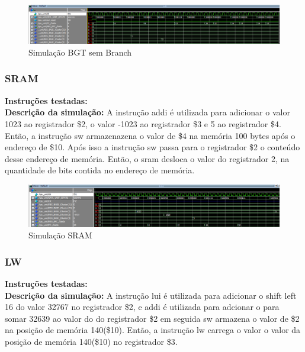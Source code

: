 \begin{figure}[htbp!]
\centering
\includegraphics[width=1\textwidth]{figure/simulacao_bgt_sem_branch.png}
\caption{Simulação BGT sem Branch} 
\label{fig:imagem_massa}
\end{figure}

\newpage

\subsubsection{SRAM}
\textbf{Instruções testadas:}
 \\

\textbf{Descrição da simulação:} A instrução addi é utilizada para adicionar o valor 1023 ao registrador \$2, o valor -1023 ao registrador \$3 e 5 ao registrador \$4. Então, a instrução sw armazenazena o valor de \$4 na memória 100 bytes após o endereço de \$10. Após isso a instrução sw passa para o registrador \$2 o conteúdo desse endereço de memória. Então, o sram desloca o valor do registrador 2, na quantidade de bits contida no endereço de memória.  \\

\begin{figure}[htbp!]
\centering
\includegraphics[width=1\textwidth]{figure/simulacao_sram.png}
\caption{Simulação SRAM} 
\label{fig:imagem_massa}
\end{figure}

\subsubsection{LW}
\textbf{Instruções testadas:}
 \\

\textbf{Descrição da simulação:} A instrução lui é utilizada para adicionar o shift left 16 do valor 32767 no registrador \$2, e addi é utilizada para adcionar o para somar 32639 ao valor do do registrador \$2 em seguida sw armazena o valor de \$2 na posição de memória 140(\$10). Então, a instrução lw carrega o valor o valor da posição de memória 140(\$10) no registrador \$3.\\

